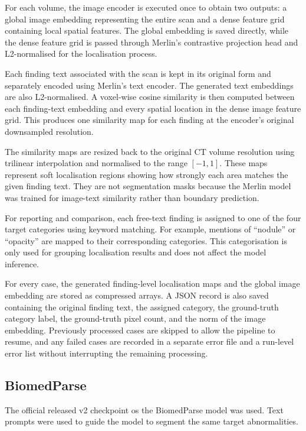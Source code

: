For each volume, the image encoder is executed once to obtain two outputs:
a global image embedding representing the entire scan and a dense feature
grid containing local spatial features. The global embedding is saved
directly, while the dense feature grid is passed through Merlin's
contrastive projection head and L2-normalised for the localisation process.

Each finding text associated with the scan is kept in its original form
and separately encoded using Merlin's text encoder. The generated text
embeddings are also L2-normalised. A voxel-wise cosine similarity is then
computed between each finding-text embedding and every spatial location
in the dense image feature grid. This produces one similarity map for
each finding at the encoder's original downsampled resolution.

The similarity maps are resized back to the original CT volume resolution
using trilinear interpolation and normalised to the range $[-1,1]$. These
maps represent soft localisation regions showing how strongly each area
matches the given finding text. They are not segmentation masks because
the Merlin model was trained for image-text similarity rather than
boundary prediction.

For reporting and comparison, each free-text finding is assigned to one
of the four target categories using keyword matching. For example,
mentions of ``nodule'' or ``opacity'' are mapped to their corresponding
categories. This categorisation is only used for grouping localisation
results and does not affect the model inference.

For every case, the generated finding-level localisation maps and the
global image embedding are stored as compressed arrays. A JSON record is
also saved containing the original finding text, the assigned category,
the ground-truth category label, the ground-truth pixel count, and the
norm of the image embedding. Previously processed cases are skipped to
allow the pipeline to resume, and any failed cases are recorded in a
separate error file and a run-level error list without interrupting the
remaining processing.

\subsection{BiomedParse}

The official released v2 checkpoint os the BiomedParse model was used. Text prompts were used to guide the model to segment
the same target abnormalities.

